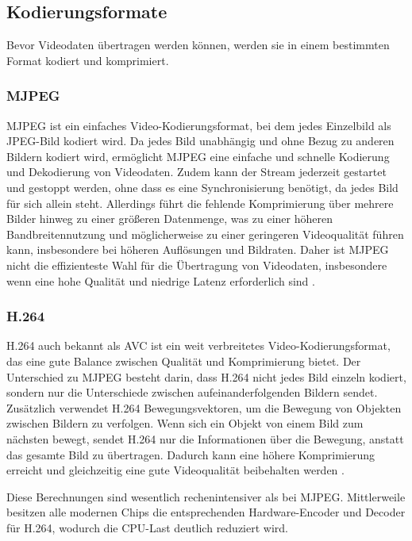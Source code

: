     \subsection{Kodierungsformate}
    Bevor Videodaten übertragen werden können, werden sie in einem bestimmten Format kodiert und komprimiert. 

        \subsubsection{MJPEG}
        \ac{MJPEG} ist ein einfaches Video-Kodierungsformat, bei dem jedes Einzelbild als \ac{JPEG}-Bild kodiert wird. Da jedes Bild unabhängig und ohne Bezug zu anderen Bildern kodiert wird, ermöglicht \ac{MJPEG} eine einfache und schnelle Kodierung und Dekodierung von Videodaten. Zudem kann der Stream jederzeit gestartet und gestoppt werden, ohne dass es eine Synchronisierung benötigt, da jedes Bild für sich allein steht. Allerdings führt die fehlende Komprimierung über mehrere Bilder hinweg zu einer größeren Datenmenge, was zu einer höheren Bandbreitennutzung und möglicherweise zu einer geringeren Videoqualität führen kann, insbesondere bei höheren Auflösungen und Bildraten. Daher ist MJPEG nicht die effizienteste Wahl für die Übertragung von Videodaten, insbesondere wenn eine hohe Qualität und niedrige Latenz erforderlich sind \cite[S. 111]{ScalableSecureMJPEG}.

        \subsubsection{H.264}
        H.264 auch bekannt als \ac{AVC} ist ein weit verbreitetes Video-Kodierungsformat, das eine gute Balance zwischen Qualität und Komprimierung bietet. Der Unterschied zu \ac{MJPEG} besteht darin, dass H.264 nicht jedes Bild einzeln kodiert, sondern nur die Unterschiede zwischen aufeinanderfolgenden Bildern sendet. Zusätzlich verwendet H.264 Bewegungsvektoren, um die Bewegung von Objekten zwischen Bildern zu verfolgen. Wenn sich ein Objekt von einem Bild zum nächsten bewegt, sendet H.264 nur die Informationen über die Bewegung, anstatt das gesamte Bild zu übertragen. Dadurch kann eine höhere Komprimierung erreicht und gleichzeitig eine gute Videoqualität beibehalten werden \cite[Kapitel 4 - 9]{H264AdvancedVideo}.

        Diese Berechnungen sind wesentlich rechenintensiver als bei \ac{MJPEG}. Mittlerweile besitzen alle modernen Chips die entsprechenden Hardware-Encoder und Decoder für H.264, wodurch die \ac{CPU}-Last deutlich reduziert wird.

